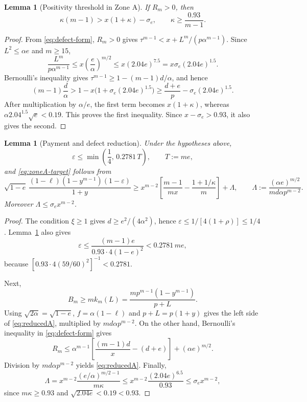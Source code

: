 \documentclass[11pt]{article}
\newtheorem{lemma}[theorem]{Lemma}
\newcommand{\eps}{\varepsilon}
\begin{document}
\begin{lemma}[Positivity threshold in Zone A]\label{lem:posA}
If $R_m>0$, then
\begin{equation}\label{eq:posA}
        \kappa(m-1)>x(1+\kappa)-\sigma_e,
        \qquad
        \kappa\ge\frac{0.93}{m-1}.
\end{equation}
\end{lemma}

\begin{proof}
From \eqref{eq:defect-form}, $R_m>0$ gives
$\tau^{m-1}<x+L^m/(p\alpha^{m-1})$.  Since $L^2\le\alpha e$ and $m\ge15$,
\[
 \frac{L^m}{p\alpha^{m-1}}
 \le x\left(\frac e\alpha\right)^{m/2}
 \le x(2.04e)^{7.5}
 =x\sigma_e(2.04e)^{1.5}.
\]
Bernoulli's inequality gives
$\tau^{m-1}\ge1-(m-1)d/\alpha$, and hence
\[
 (m-1)\frac d\alpha
 >1-x\bigl(1+\sigma_e(2.04e)^{1.5}\bigr)
 \ge\frac{d+e}{p}-\sigma_e(2.04e)^{1.5}.
\]
After multiplication by $\alpha/e$, the first term becomes $x(1+\kappa)$,
whereas
$\alpha 2.04^{1.5}\sqrt e<0.19$.  This proves the first inequality.
Since $x-\sigma_e>0.93$, it also gives the second.
\end{proof}

\begin{lemma}[Payment and defect reduction]\label{lem:reduceA}
Under the hypotheses above,
\begin{equation}\label{eq:epsA}
        \eps\le\min\left(\frac14,\,0.2781\,T\right),
        \qquad T:=me,
\end{equation}
and \eqref{eq:zoneA-target} follows from
\begin{equation}\label{eq:reducedA}
 \sqrt{1-e}\,\frac{(1-\ell)(1-y^{m-1})(1-\eps)}{1+y}
 \ge
 x^{m-2}\left[\frac{m-1}{mx}-\frac{1+1/\kappa}{m}\right]+\Lambda,
 \qquad
 \Lambda:=\frac{(\alpha e)^{m/2}}{m d\alpha p^{m-2}}.
\end{equation}
Moreover $\Lambda\le\sigma_e x^{m-2}$.
\end{lemma}

\begin{proof}
The condition $\xi\ge1$ gives $d\ge e^2/(4\alpha^2)$, hence
$\eps\le1/[4(1+\rho)]\le1/4$.  Lemma~\ref{lem:posA} also gives
\[
 \eps\le\frac{(m-1)e}{0.93\cdot4(1-e)^2}
 <0.2781\,me,
\]
because $[0.93\cdot4(59/60)^2]^{-1}<0.2781$.

Next,
\[
 B_m\ge m k_m(L)
 =\frac{m p^{m-1}(1-y^{m-1})}{p+L}.
\]
Using $\sqrt{2\alpha}=\sqrt{1-e}$, $f=\alpha(1-\ell)$ and
$p+L=p(1+y)$ gives the left side of \eqref{eq:reducedA}, multiplied by
$m d\alpha p^{m-2}$.  On the other hand, Bernoulli's inequality in
\eqref{eq:defect-form} gives
\[
 R_m\le\alpha^{m-1}\left[\frac{(m-1)d}{x}-(d+e)\right]
       +(\alpha e)^{m/2}.
\]
Division by $m d\alpha p^{m-2}$ yields \eqref{eq:reducedA}.  Finally,
\[
 \Lambda=x^{m-2}\frac{(e/\alpha)^{m/2-1}}{m\kappa}
 \le x^{m-2}\frac{(2.04e)^{6.5}}{0.93}
 \le\sigma_e x^{m-2},
\]
since $m\kappa\ge0.93$ and $\sqrt{2.04e}<0.19<0.93$.
\end{proof}
\end{document}
